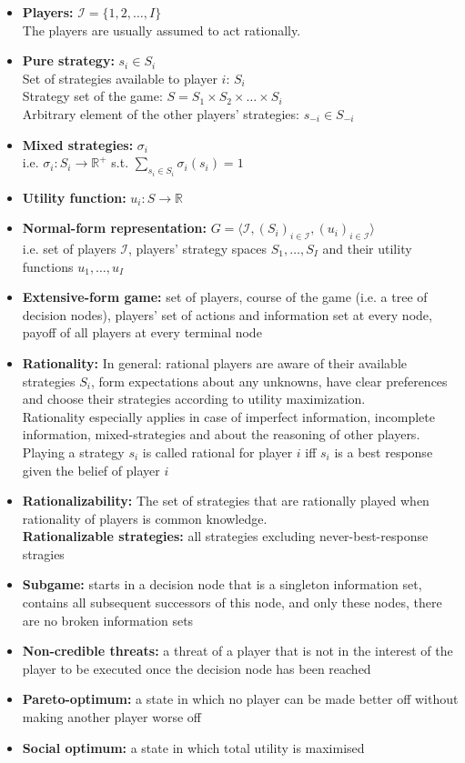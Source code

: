 \documentclass[a4paper,landscape,7pt,fleqn]{scrartcl}
\renewcommand{\emph}[1]{\textbf{#1}}
\begin{document}
\begin{multicols*}{3}
\begin{itemize}
\item \emph{Players:} $\mathcal{I} = \lbrace 1,2,\ldots,I \rbrace$ \\
The players are usually assumed to act rationally.
\item \emph{Pure strategy:} $s_i \in S_i$ \\
Set of strategies available to player $i$: $S_i$ \\
Strategy set of the game: $S = S_1 \times S_2 \times \ldots \times S_i$ \\
Arbitrary element of the other players' strategies: $s_{-i} \in S_{-i}$
\item \emph{Mixed strategies:} $\sigma_i$ \\
i.e. $\sigma_i : S_i \to \mathbb{R}^+$ s.t. $\sum_{s_i \in S_i} \sigma_i(s_i) = 1$
\item \emph{Utility function:} $u_i : S \to \mathbb{R}$
\item \emph{Normal-form representation:} $G = \langle \mathcal{I},(S_i)_{i \in \mathcal{I}}, (u_i)_{i \in \mathcal{I}} \rangle$ \\
i.e. set of players $\mathcal{I}$, players' strategy spaces $S_1, \ldots, S_I$ and their utility functions $u_1, \ldots, u_I$
\item \emph{Extensive-form game:} set of players, course of the game (i.e. a tree of decision nodes), players' set of actions and information set at every node, payoff of all players at every terminal node
\item \emph{Rationality:} In general: rational players are aware of their available strategies $S_i$, form expectations about any unknowns, have clear preferences and choose their strategies according to utility maximization. \\
Rationality especially applies in case of imperfect information, incomplete information, mixed-strategies and about the reasoning of other players. \\
Playing a strategy $s_i$ is called rational for player $i$ iff $s_i$ is a best response given the belief of player $i$
\item \emph{Rationalizability:} The set of strategies that are rationally played when rationality of players is common knowledge. \\
\emph{Rationalizable strategies:} all strategies excluding never-best-response stragies
\item \emph{Subgame:} starts in a decision node that is a singleton information set, contains all subsequent successors of this node, and only these nodes, there are no broken information sets
\item \emph{Non-credible threats:} a threat of a player that is not in the interest of the player to be executed once the decision node has been reached
\item \emph{Pareto-optimum:} a state in which no player can be made better off without making another player worse off
\item \emph{Social optimum:} a state in which total utility is maximised
\end{itemize}


\end{multicols*}
\end{document}
